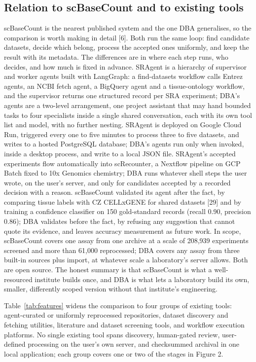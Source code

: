 \documentclass[11pt,a4paper]{article}
\begin{document}
\subsection{Relation to scBaseCount and to existing
tools}\label{relation-to-scbasecount-and-to-existing-tools}

scBaseCount is the nearest published system and the one DBA generalises,
so the comparison is worth making in detail {[}6{]}. Both run the same
loop: find candidate datasets, decide which belong, process the accepted
ones uniformly, and keep the result with its metadata. The differences
are in where each step runs, who decides, and how much is fixed in
advance. SRAgent is a hierarchy of supervisor and worker agents built
with LangGraph: a find-datasets workflow calls Entrez agents, an NCBI
fetch agent, a BigQuery agent and a tissue-ontology workflow, and the
supervisor returns one structured record per SRA experiment; DBA's
agents are a two-level arrangement, one project assistant that may hand
bounded tasks to four specialists inside a single shared conversation,
each with its own tool list and model, with no further nesting. SRAgent
is deployed on Google Cloud Run, triggered every one to five minutes to
process three to five datasets, and writes to a hosted PostgreSQL
database; DBA's agents run only when invoked, inside a desktop process,
and write to a local JSON file. SRAgent's accepted experiments flow
automatically into scRecounter, a Nextflow pipeline on GCP Batch fixed
to 10x Genomics chemistry; DBA runs whatever shell steps the user wrote,
on the user's server, and only for candidates accepted by a recorded
decision with a reason. scBaseCount validated its agent after the fact,
by comparing tissue labels with CZ CELLxGENE for shared datasets
{[}29{]} and by training a confidence classifier on 150 gold-standard
records (recall 0.90, precision 0.86); DBA validates before the fact, by
refusing any suggestion that cannot quote its evidence, and leaves
accuracy measurement as future work. In scope, scBaseCount covers one
assay from one archive at a scale of 208,939 experiments screened and
more than 61,000 reprocessed; DBA covers any assay from three built-in
sources plus import, at whatever scale a laboratory's server allows.
Both are open source. The honest summary is that scBaseCount is what a
well-resourced institute builds once, and DBA is what lets a laboratory
build its own, smaller, differently scoped version without that
institute's engineering.

Table~\ref{tab:features} widens the comparison to four groups of existing tools:
agent-curated or uniformly reprocessed repositories, dataset discovery
and fetching utilities, literature and dataset screening tools, and
workflow execution platforms. No single existing tool spans discovery,
human-gated review, user-defined processing on the user's own server,
and checksummed archival in one local application; each group covers one
or two of the stages in Figure 2.
\end{document}
